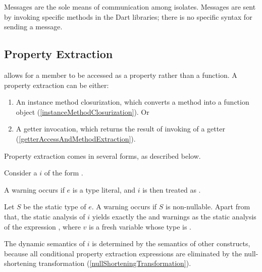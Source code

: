 \documentclass[makeidx]{article}
\begin{document}
{\LMHash{}%
Messages are the sole means of communication among isolates.
Messages are sent by invoking specific methods in the Dart libraries; there is no specific syntax for sending a message.



\subsection{Property Extraction}

\LMHash{}%
allows for a member to be accessed as a property rather than a function.
A property extraction can be either:
\begin{enumerate}
\item An instance method closurization,
  which converts a method into a function object
  (\ref{instanceMethodClosurization}).
  Or
\item A getter invocation, which returns
  the result of invoking of a getter
  (\ref{getterAccessAndMethodExtraction}).
\end{enumerate}


\LMHash{}%
Property extraction comes in several forms, as described below.

\LMHash{}%
Consider a 
%
$i$ of the form .

\LMHash{}%
A warning occurs if $e$ is a type literal,
and $i$ is then treated as .

\LMHash{}%
Let $S$ be the static type of $e$.
A warning occurs if $S$ is non-nullable.
Apart from that,
the static analysis of $i$ yields
exactly the  and warnings as
the static analysis of the expression ,
where $v$ is a fresh variable whose type is .

\LMHash{}%
The dynamic semantics of $i$ is determined by the semantics of other constructs,
because all conditional property extraction expressions are eliminated by the
null-shortening transformation
(\ref{nullShorteningTransformation}).
\EndCase

}
\end{document}
